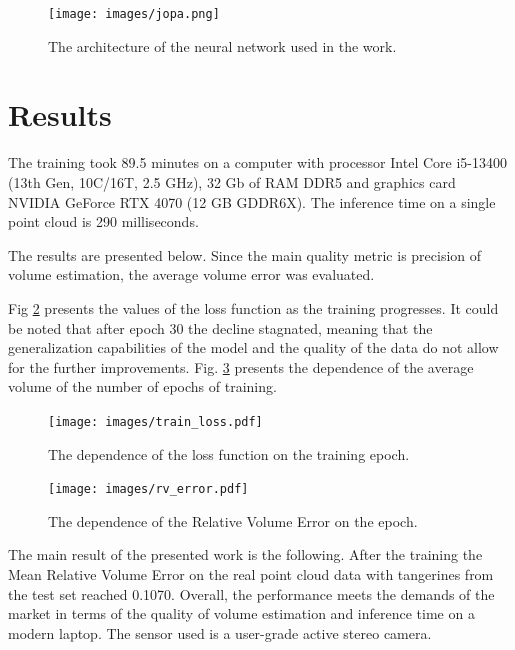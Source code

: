 \begin{thebibliography}{12}
\begin{figure}[htbp]
\centerline{\texttt{[image: images/jopa.png]}}
\caption{The architecture of the neural network used in the work.}
\label{diagram}
\end{figure}

\section{Results}

The training took 89.5 minutes on a computer with processor Intel Core i5-13400 (13th Gen, 10C/16T, 2.5 GHz), 32 Gb of RAM DDR5 and graphics card NVIDIA GeForce RTX 4070 (12 GB GDDR6X).
The inference time on a single point cloud is 290 milliseconds.

The results are presented below.
Since the main quality metric is precision of volume estimation, the average volume error was evaluated.


Fig \ref{fig_all} presents the values of the loss function as the training progresses.
It could be noted that after epoch 30 the decline stagnated, meaning that the generalization capabilities of the model and the quality of the data do not allow for the further improvements.
Fig. \ref{error_volume} presents the dependence of the average volume of the number of epochs of training.

\begin{figure}[htbp]
\centerline{\texttt{[image: images/train\_loss.pdf]}}
\caption{The dependence of the loss function on the training epoch.}
\label{fig_all}
\end{figure}

\begin{figure}[htbp]
\centerline{\texttt{[image: images/rv\_error.pdf]}}
\caption{The dependence of the Relative Volume Error on the epoch.}
\label{error_volume}
\end{figure}

The main result of the presented work is the following.
After the training the Mean Relative Volume Error on the real point cloud data with tangerines from the test set reached 0.1070.
Overall, the performance meets the demands of the market in terms of the quality of volume estimation and inference time on a modern laptop.
The sensor used is a user-grade active stereo camera.


\end{thebibliography}
